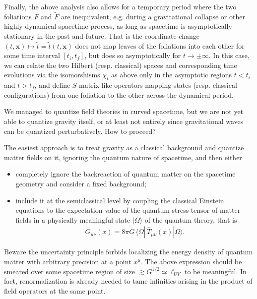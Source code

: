 \documentclass[../QFT_main.tex]{subfiles}
\begin{document}
\begin{mytheorem}
Finally, the above analysis also allows for a temporary period where the two foliations $F$ and $\tilde{F}$ are inequivalent, e.g. during a gravitational collapse or other highly dynamical spacetime process, as long as spacetime is asymptotically stationary in the past and future.
That is the coordinate change $(t,\mathbf{x})\mapsto \tilde{t}=\tilde{t}(t,\mathbf{x})$ does not map leaves of the foliations into each other for some time interval $[t_i,t_f]$, but does so asymptotically for $t\to \pm\infty$.
In this case, we can relate the two Hilbert (resp. classical) spaces and corresponding time evolutions via the isomorshisms $\chi_t$ as above only in the asymptotic regions $t<t_i$ and $t>t_f$, and define $S$-matrix like operators mapping states (resp. classical configurations) from one foliation to the other across the dynamical period.
\end{mytheorem}


\begin{mytheorem}
%
We managed to quantize field theories in curved spacetime, but we are not yet able to quantize gravity itself, or at least not entirely since gravitational waves can be quantized perturbatively.
How to proceed?

The easiest approach is to treat gravity as a classical background and quantize matter fields on it, ignoring the quantum nature of spacetime, and then either
\begin{itemize}
  \item completely ignore the backreaction of quantum matter on the spacetime geometry and consider a fixed background;
  \item include it at the semiclassical level by coupling the classical Einstein equations to the expectation value of the quantum stress tensor of matter fields in a physically meaningful state $|\Omega\rangle$ of the quantum theory, that is
\begin{align}
  G_{\mu\nu}(x) = 8\pi G \,\langle \Omega |\,  \hat{T}_{\mu\nu}(x) | \Omega \rangle. 
\end{align}
\end{itemize}
Beware the uncertainty principle forbids localizing the energy density of quantum matter with arbitrary precision at a point $x^\mu$.
The above expression should be smeared over some spacetime region of size $\gtrsim G^{1/2}\simeq \ell_{UV}$ to be meaningful.
In fact, renormalization is already needed to tame infinities arising in the product of field operators at the same point.
\end{mytheorem}
\end{document}
